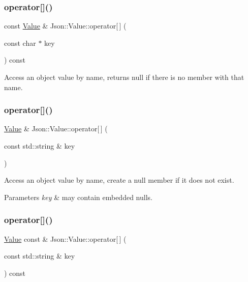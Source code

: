 \subsubsection{\texorpdfstring{operator[]()}{operator[]()}\hspace{0.1cm}{\footnotesize\ttfamily [6/9]}}
{\footnotesize\ttfamily const \hyperlink{class_json_1_1_value}{Value} \& Json\+::\+Value\+::operator\mbox{[}$\,$\mbox{]} (\begin{DoxyParamCaption}\item[{const char $\ast$}]{key }\end{DoxyParamCaption}) const}

Access an object value by name, returns null if there is no member with that name. \mbox{\label{class_json_1_1_value_ae511c7d46bf457412fb55c9471af9f50}} 
\subsubsection{\texorpdfstring{operator[]()}{operator[]()}\hspace{0.1cm}{\footnotesize\ttfamily [7/9]}}
{\footnotesize\ttfamily \hyperlink{class_json_1_1_value}{Value} \& Json\+::\+Value\+::operator\mbox{[}$\,$\mbox{]} (\begin{DoxyParamCaption}\item[{const std\+::string \&}]{key }\end{DoxyParamCaption})}

Access an object value by name, create a null member if it does not exist. 
\begin{DoxyParams}{Parameters}
{\em key} & may contain embedded nulls. \\
\hline
\end{DoxyParams}
\mbox{\label{class_json_1_1_value_abff34025850a989a92cf936f4cc99982}} 
\subsubsection{\texorpdfstring{operator[]()}{operator[]()}\hspace{0.1cm}{\footnotesize\ttfamily [8/9]}}
{\footnotesize\ttfamily \hyperlink{class_json_1_1_value}{Value} const  \& Json\+::\+Value\+::operator\mbox{[}$\,$\mbox{]} (\begin{DoxyParamCaption}\item[{const std\+::string \&}]{key }\end{DoxyParamCaption}) const}

